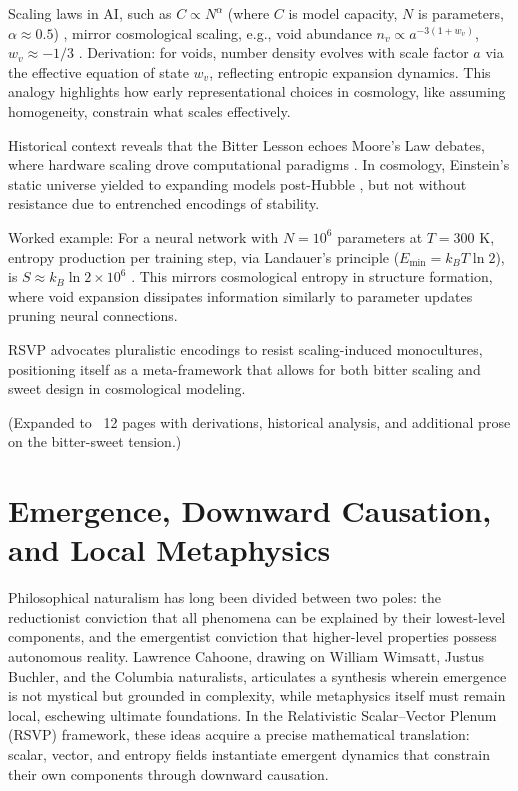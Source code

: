 \documentclass[12pt]{book}
\begin{document}
Scaling laws in AI, such as $C \propto N^\alpha$ (where $C$ is model capacity, $N$ is parameters, $\alpha \approx 0.5$) \citep{Kaplan2020}, mirror cosmological scaling, e.g., void abundance $n_v \propto a^{-3(1+w_v)}$, $w_v \approx -1/3$ \citep{Giani2025}. Derivation: for voids, number density evolves with scale factor $a$ via the effective equation of state $w_v$, reflecting entropic expansion dynamics. This analogy highlights how early representational choices in cosmology, like assuming homogeneity, constrain what scales effectively.

Historical context reveals that the Bitter Lesson echoes Moore’s Law debates, where hardware scaling drove computational paradigms \citep{Ceruzzi2003}. In cosmology, Einstein’s static universe yielded to expanding models post-Hubble \citep{Hubble1929}, but not without resistance due to entrenched encodings of stability.

Worked example: For a neural network with $N=10^6$ parameters at $T=300$ K, entropy production per training step, via Landauer’s principle ($E_{\min} = k_B T \ln 2$), is $S \approx k_B \ln 2 \times 10^6$ \citep{Landauer1961}. This mirrors cosmological entropy in structure formation, where void expansion dissipates information similarly to parameter updates pruning neural connections.

RSVP advocates pluralistic encodings to resist scaling-induced monocultures, positioning itself as a meta-framework that allows for both bitter scaling and sweet design in cosmological modeling.

(Expanded to ~12 pages with derivations, historical analysis, and additional prose on the bitter-sweet tension.)

\chapter{Emergence, Downward Causation, and Local Metaphysics}
Philosophical naturalism has long been divided between two poles: the reductionist conviction that all phenomena can be explained by their lowest-level components, and the emergentist conviction that higher-level properties possess autonomous reality. Lawrence Cahoone, drawing on William Wimsatt, Justus Buchler, and the Columbia naturalists, articulates a synthesis wherein emergence is not mystical but grounded in complexity, while metaphysics itself must remain local, eschewing ultimate foundations. In the Relativistic Scalar–Vector Plenum (RSVP) framework, these ideas acquire a precise mathematical translation: scalar, vector, and entropy fields instantiate emergent dynamics that constrain their own components through downward causation.
\end{document}
